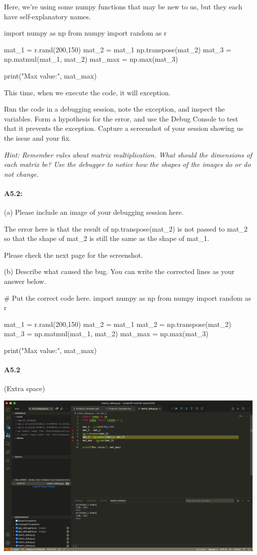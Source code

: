 \documentclass[11pt]{article}
\begin{document}
Here, we're using some numpy functions that may be new to us, but they each have self-explanatory names.

\begin{python}
import numpy as np
from numpy import random as r

mat_1 = r.rand(200,150)
mat_2 = mat_1
np.transpose(mat_2)
mat_3 = np.matmul(mat_1, mat_2)
mat_max = np.max(mat_3)

print("Max value:", mat_max)
\end{python}

This time, when we execute the code, it will exception.

Run the code in a debugging session, note the exception, and inspect the variables. Form a hypothesis for the error, and use the Debug Console to test that it prevents the exception. Capture a screenshot of your session showing us the issue and your fix.

\emph{Hint: Remember rules about matrix multiplication. What should the dimensions of each matrix be? Use the debugger to notice how the shapes of the images do or do not change.}

\paragraph{A5.2:} 

(a) Please include an image of your debugging session here.

The error here is that the result of np.transpose(mat\_2) is not passed to mat\_2 so that the shape of mat\_2 is still the same as the shape of mat\_1.

Please check the next page for the screenshot.

(b) Describe what caused the bug. You can write the corrected lines as your answer below.

\begin{python}
    # Put the correct code here.
    import numpy as np
    from numpy import random as r
    
    mat_1 = r.rand(200,150)
    mat_2 = mat_1
    mat_2 = np.transpose(mat_2)
    mat_3 = np.matmul(mat_1, mat_2)
    mat_max = np.max(mat_3)
    
    print("Max value:", mat_max)
\end{python}


\pagebreak
\paragraph{A5.2} (Extra space)

\includegraphics[width=\textwidth]{matrix_debug.png}
\end{document}
